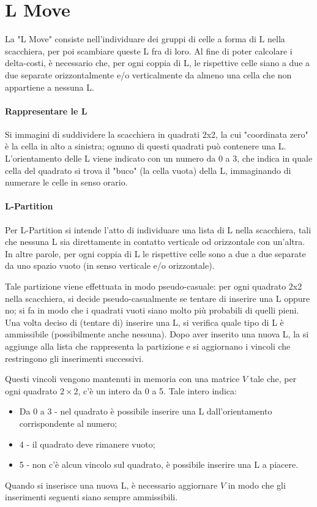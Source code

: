 
\section{L Move} %
\label{sec:l_move}

La "L Move" consiste nell'individuare dei gruppi di celle a forma di L nella scacchiera, per poi scambiare queste L fra di loro. Al fine di poter calcolare i delta-costi, è necessario che, per ogni coppia di L, le rispettive celle siano a due a due separate orizzontalmente e/o verticalmente da almeno una cella che non appartiene a nessuna L.

\paragraph{Rappresentare le L}
Si immagini di suddividere la scacchiera in quadrati 2x2, la cui "coordinata zero" è la cella in alto a sinistra; ognuno di questi quadrati può contenere una L. L'orientamento delle L viene indicato con un numero da 0 a 3, che indica in quale cella del quadrato si trova il "buco" (la cella vuota) della L, immaginando di numerare le celle in senso orario.


\paragraph{L-Partition}
Per L-Partition si intende l'atto di individuare una lista di L nella scacchiera, tali che nessuna L sia direttamente in contatto verticale od orizzontale con un'altra. In altre parole, per ogni coppia di L le rispettive celle sono a due a due separate da uno spazio vuoto (in senso verticale e/o orizzontale). 

Tale partizione viene effettuata in modo pseudo-casuale: per ogni quadrato 2x2 nella scacchiera, si decide pseudo-casualmente se tentare di inserire una L oppure no; si fa in modo che i quadrati vuoti siano molto più probabili di quelli pieni. Una volta deciso di (tentare di) inserire una L, si verifica quale tipo di L è ammissibile (possibilmente anche nessuna). Dopo aver inserito una nuova L, la si aggiunge alla lista che rappresenta la partizione e si aggiornano i vincoli che restringono gli inserimenti successivi.

Questi vincoli vengono mantenuti in memoria con una matrice $V$ tale che, per ogni quadrato $2\times 2$, c'è un intero da 0 a 5. Tale intero indica:
\begin{itemize}
	\item Da 0 a 3 - nel quadrato è possibile inserire una L dall'orientamento corrispondente al numero;
	\item 4 - il quadrato deve rimanere vuoto;
	\item 5 - non c'è alcun vincolo sul quadrato, è possibile inserire una L a piacere.
\end{itemize}
Quando si inserisce una nuova L, è necessario aggiornare $V$ in modo che gli inserimenti seguenti siano sempre ammissibili. 

